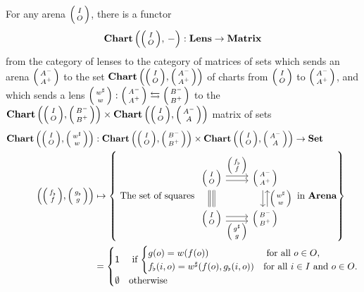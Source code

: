 \documentclass[DynamicalBook]{subfiles}
\begin{document}
\begin{proposition}\label{prop.lens_to_matrix_functor_discrete}
  For any arena $\lens{I}{O}$, there is a functor 
$$\Cat{Chart}\left( \littlelens{I}{O},\, - \right) : \Cat{Lens} \to \Cat{Matrix}$$
from the category of lenses to the category of matrices of sets which sends an
arena $\lens{A^-}{A^+}$ to the set $\Cat{Chart}\left( \lens{I}{O},
  \lens{A^-}{A^+} \right)$ of charts from $\lens{I}{O}$ to $\lens{A^-}{A^+}$,
and which sends a lens $\lens{w^{\sharp}}{w} : \lens{A^-}{A^+} \fromto
\lens{B^-}{B^+}$ to the $\Cat{Chart}\left( \lens{I}{O}, \lens{B^-}{B^+} \right)
\times \Cat{Chart}\left( \lens{I}{O}, \lens{A^-}{A} \right)$ matrix of sets
\begin{align*}
 \Cat{Chart}\left( \littlelens{I}{O}, \littlelens{w^{\sharp}}{w} \right) &: \Cat{Chart}\left( \littlelens{I}{O}, \littlelens{B^-}{B^+} \right)
\times \Cat{Chart}\left( \littlelens{I}{O}, \littlelens{A^-}{A} \right) \to \smset \\
\left( \littlelens{f_{\flat}}{f}, \littlelens{g_{\flat}}{g} \right) &\mapsto \left\{ \mbox{ The set of squares }
      \begin{tikzcd}[ampersand replacement = \&]
        \lens{I}{O} \ar[r, shift left, "\lens{f_{\flat}}{f}"] \ar[r, shift
        right] \ar[d, shift right, equals] \ar[d, shift left,
        leftarrow, equals] \& \lens{A^-}{A^+} \ar[d, shift left, leftarrow,
        "\lens{w^{\sharp}}{w}"] \ar[d, shift right]\\
        \lens{I}{O} \ar[r, shift right, "\lens{g^{\sharp}}{g}"'] \ar[r,
        shift left] \& \lens{B^-}{B^+}
      \end{tikzcd}  \mbox{ in $\Cat{Arena}$}   \right\} \\
&=\begin{cases} \ord{1} &\mbox{ if \(\begin{cases} g(o) = w(f(o)) &\mbox{ for all $o \in O$,}\\ f_{\flat}(i, o) = w^{\sharp}(f(o), g_{\flat}(i, o)) &\mbox{for all $i \in I$ and $o \in O$.}\end{cases}\)} \\ \emptyset &\mbox{otherwise} \end{cases}
\end{align*}
\end{proposition}
\end{document}
